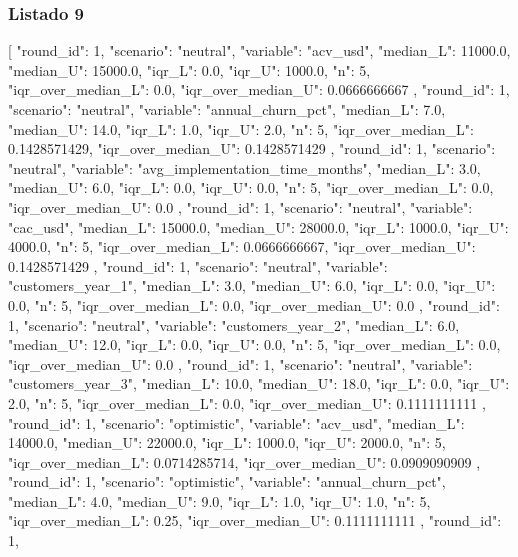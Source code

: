 \subsubsection{Listado 9}
\label{anexo:code-6-3-2-9}

\begin{APACode}
[
  {
    "round_id": 1,
    "scenario": "neutral",
    "variable": "acv_usd",
    "median_L": 11000.0,
    "median_U": 15000.0,
    "iqr_L": 0.0,
    "iqr_U": 1000.0,
    "n": 5,
    "iqr_over_median_L": 0.0,
    "iqr_over_median_U": 0.0666666667
  },
  {
    "round_id": 1,
    "scenario": "neutral",
    "variable": "annual_churn_pct",
    "median_L": 7.0,
    "median_U": 14.0,
    "iqr_L": 1.0,
    "iqr_U": 2.0,
    "n": 5,
    "iqr_over_median_L": 0.1428571429,
    "iqr_over_median_U": 0.1428571429
  },
  {
    "round_id": 1,
    "scenario": "neutral",
    "variable": "avg_implementation_time_months",
    "median_L": 3.0,
    "median_U": 6.0,
    "iqr_L": 0.0,
    "iqr_U": 0.0,
    "n": 5,
    "iqr_over_median_L": 0.0,
    "iqr_over_median_U": 0.0
  },
  {
    "round_id": 1,
    "scenario": "neutral",
    "variable": "cac_usd",
    "median_L": 15000.0,
    "median_U": 28000.0,
    "iqr_L": 1000.0,
    "iqr_U": 4000.0,
    "n": 5,
    "iqr_over_median_L": 0.0666666667,
    "iqr_over_median_U": 0.1428571429
  },
  {
    "round_id": 1,
    "scenario": "neutral",
    "variable": "customers_year_1",
    "median_L": 3.0,
    "median_U": 6.0,
    "iqr_L": 0.0,
    "iqr_U": 0.0,
    "n": 5,
    "iqr_over_median_L": 0.0,
    "iqr_over_median_U": 0.0
  },
  {
    "round_id": 1,
    "scenario": "neutral",
    "variable": "customers_year_2",
    "median_L": 6.0,
    "median_U": 12.0,
    "iqr_L": 0.0,
    "iqr_U": 0.0,
    "n": 5,
    "iqr_over_median_L": 0.0,
    "iqr_over_median_U": 0.0
  },
  {
    "round_id": 1,
    "scenario": "neutral",
    "variable": "customers_year_3",
    "median_L": 10.0,
    "median_U": 18.0,
    "iqr_L": 0.0,
    "iqr_U": 2.0,
    "n": 5,
    "iqr_over_median_L": 0.0,
    "iqr_over_median_U": 0.1111111111
  },
  {
    "round_id": 1,
    "scenario": "optimistic",
    "variable": "acv_usd",
    "median_L": 14000.0,
    "median_U": 22000.0,
    "iqr_L": 1000.0,
    "iqr_U": 2000.0,
    "n": 5,
    "iqr_over_median_L": 0.0714285714,
    "iqr_over_median_U": 0.0909090909
  },
  {
    "round_id": 1,
    "scenario": "optimistic",
    "variable": "annual_churn_pct",
    "median_L": 4.0,
    "median_U": 9.0,
    "iqr_L": 1.0,
    "iqr_U": 1.0,
    "n": 5,
    "iqr_over_median_L": 0.25,
    "iqr_over_median_U": 0.1111111111
  },
  {
    "round_id": 1,
}
\end{APACode}
